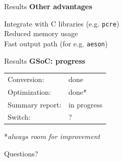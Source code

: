 \documentclass[20pt]{beamer}
\newcommand{\vspaced}{
    \vspace{5mm}
}
\begin{document}
\begin{frame}{Results}
    \textbf{Other advantages} \\
    \vspaced
    Integrate with C libraries (e.g. \texttt{pcre}) \\
    Reduced memory usage \\
    Fast output path (for e.g. \texttt{aeson}) \\
\end{frame}

\begin{frame}{Results}
    \textbf{GSoC: progress} \\
    \vspaced
    \begin{tabular}{ll}
    Conversion:     & done \\
    Optimization:   & done* \\
    Summary report: & in progress \\
    Switch:         & ? \\
    \end{tabular}
    \newline
    \newline
    \vspaced
    *\small{\textit{always room for improvement}} \\
\end{frame}

\begin{frame}[plain]
    \begin{center}
    \huge{Questions?}
    \end{center}
\end{frame}
\end{document}
